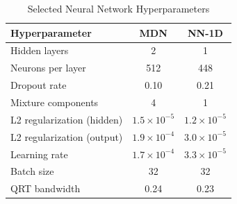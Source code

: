 \begin{table}[H]
\centering
\caption{Selected Neural Network Hyperparameters}
\label{tab:nn_hparams}
\begin{tabular}{lcc}
\toprule
Hyperparameter & MDN & NN-1D \\
\midrule
Hidden layers & 2 & 1 \\
Neurons per layer & 512 & 448 \\
Dropout rate & 0.10 & 0.21 \\
Mixture components & 4 & 1 \\
L2 regularization (hidden) & $1.5 \times 10^{-5}$ & $1.2 \times 10^{-5}$ \\
L2 regularization (output) & $1.9 \times 10^{-4}$ & $3.0 \times 10^{-5}$ \\
Learning rate & $1.7 \times 10^{-4}$ & $3.3 \times 10^{-5}$ \\
Batch size & 32 & 32 \\
QRT bandwidth & 0.24 & 0.23 \\
\bottomrule
\end{tabular}
\end{table}
